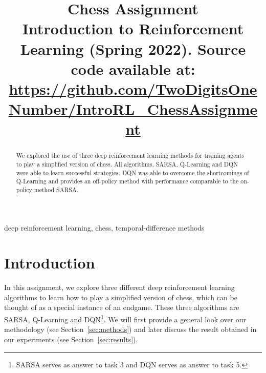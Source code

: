 \documentclass[conference]{IEEEtran}
\begin{document}
\title{Chess Assignment\\
{\footnotesize Introduction to Reinforcement Learning (Spring 2022). Source code available at:
 \href{https://github.com/TwoDigitsOneNumber/IntroRL\_ChessAssignment}{https://github.com/TwoDigitsOneNumber/IntroRL\_ChessAssignment}}
}

\author{
}

\maketitle

\begin{abstract}
    We explored the use of three deep reinforcement learning methods for training agents to play a simplified version of chess. All algorithms, SARSA, Q-Learning and DQN were able to learn successful strategies. DQN was able to overcome the shortcomings of Q-Learning and provides an off-policy method with performance comparable to the on-policy method SARSA.
\end{abstract}

\begin{IEEEkeywords}
    deep reinforcement learning, chess, temporal-difference methods
\end{IEEEkeywords}







\section{Introduction}\label{sec:introduction}


In this assignment, we explore three different deep reinforcement learning algorithms to learn how to play a simplified version of chess, which can be thought of as a special instance of an endgame. These three algorithms are SARSA, Q-Learning and DQN\footnote{SARSA serves as answer to task 3 and DQN serves as answer to task 5.}. We will first provide a general look over our methodology (see Section~\ref{sec:methods}) and later discuss the result obtained in our experiments (see Section~\ref{sec:results}).
\end{document}
